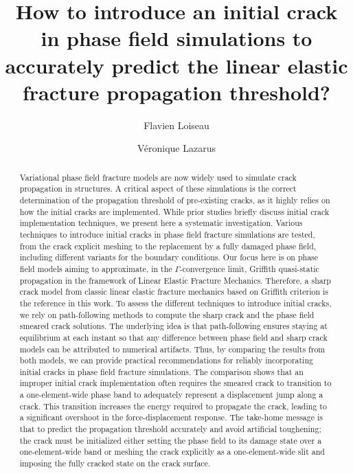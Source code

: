 \documentclass[OptSoft]{jtcam_preprint}
\title{How to introduce an initial crack in phase field simulations to accurately predict the  linear elastic fracture propagation threshold?}
\author[1]{\orcid{0000-0002-6305-7309} Flavien Loiseau}
\author[1]{\orcid{0000-0003-0081-2650} Véronique Lazarus}
\affil[1]{IMSIA, ENSTA, EDF, CNRS, Palaiseau, 91120, France}
\begin{document}
\def\version{Preprint, version of \today.}

\begin{abstract}
Variational phase field fracture models are now widely used to simulate crack propagation in structures.
A critical aspect of these simulations is the correct determination of the propagation threshold of pre-existing cracks, as it highly relies on how the initial cracks are implemented.
While prior studies briefly discuss initial crack implementation techniques, we present here a systematic investigation.
Various techniques to introduce initial cracks in phase field fracture simulations are tested, from the crack explicit meshing to the replacement by a fully damaged phase field, including different variants for the boundary conditions.
Our focus here is on phase field models aiming to approximate, in the $\Gamma$-convergence limit, Griffith quasi-static propagation in the framework of Linear Elastic Fracture Mechanics. 
Therefore, a sharp crack model from classic linear elastic fracture mechanics based on Griffith criterion is the reference in this work.
To assess the different techniques to introduce initial cracks, we rely on path-following methods to compute the sharp crack and the phase field smeared crack solutions.
The underlying idea is that path-following ensures staying at equilibrium at each instant so that any difference between phase field and sharp crack models can be attributed to numerical artifacts.  
Thus, by comparing the results from both models, we can provide practical recommendations for reliably incorporating initial cracks in phase field fracture simulations.
The comparison shows that an improper initial crack implementation often requires the smeared crack to transition to a one-element-wide phase band to adequately represent a displacement jump along a crack.
This transition increases the energy required to propagate the crack, leading to a significant overshoot in the force-displacement response.
The take-home message is that to predict the propagation threshold accurately and avoid artificial toughening; the crack must be initialized either setting the phase field to its damage state over a one-element-wide band or meshing the crack explicitly as a one-element-wide slit and imposing the fully cracked state on the crack surface.
\end{abstract}
\end{document}
